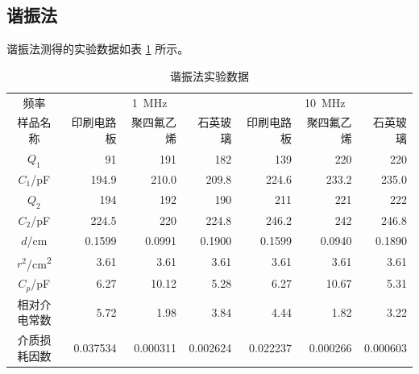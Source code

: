 \documentclass[a4paper,utf8]{article}
\begin{document}
\subsection{谐振法}
谐振法测得的实验数据如表 \ref{table:xiezhen} 所示。
\begin{table}[!ht]
    \caption{谐振法实验数据} \label{table:xiezhen}
    \begin{tabular}{c*{6}{r}} \toprule
        频率 & \multicolumn{3}{c}{\SI{1}{\MHz}} & \multicolumn{3}{c}{\SI{10}{\MHz}} \\
        样品名称 & 印刷电路板 & 聚四氟乙烯 & 石英玻璃 & 印刷电路板 & 聚四氟乙烯 & 石英玻璃 \\ \midrule
        $Q_1$ & 91 & 191 & 182 & 139 & 220 & 220 \\
        $C_1$/\unit{\pF} & 194.9 & 210.0 & 209.8 & 224.6 & 233.2 & 235.0 \\
        $Q_2$ & 194 & 192 & 190 & 211 & 221 & 222 \\
        $C_2$/\unit{\pF} & 224.5 & 220 & 224.8 & 246.2 & 242 & 246.8 \\
        $d$/\unit{\cm} & 0.1599 & 0.0991 & 0.1900 & 0.1599 & 0.0940 & 0.1890 \\
        $r^2$/\unit{\cm^2} & 3.61 & 3.61 & 3.61 & 3.61 & 3.61 & 3.61 \\
        $C_p$/\unit{\pF} & 6.27 & 10.12 & 5.28 & 6.27 & 10.67 & 5.31 \\
        相对介电常数 & 5.72 & 1.98 & 3.84 & 4.44 & 1.82 & 3.22 \\
        介质损耗因数 & 0.037534 & 0.000311 & 0.002624 & 0.022237 & 0.000266 & 0.000603 \\ \bottomrule
    \end{tabular}
\end{table}
\end{document}
